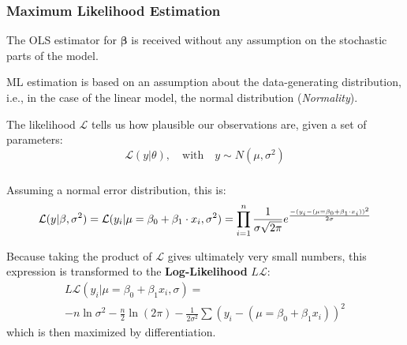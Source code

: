\documentclass{beamer}
\newenvironment{VerbatimIN}
 {\VerbatimEnvironment
  \begin{tcolorbox}[
    breakable,
    colback=lightgray,
    spartan
  ]%
  \begin{Verbatim}}
 {\end{Verbatim}\end{tcolorbox}}
\newenvironment{VerbatimOUT}
 {\VerbatimEnvironment
  \begin{tcolorbox}[
    breakable,
    spartan
  ]%
  \begin{Verbatim}}
 {\end{Verbatim}\end{tcolorbox}}
\begin{document}

\begin{frame}
    \frametitle{Maximum Likelihood Estimation}
    The OLS estimator for $\mathbf{{\beta}}$ is received without any assumption on the stochastic parts of the model.
    
    ML estimation is based on an assumption about the data-generating distribution, i.e., in the case of the linear model, the normal distribution (\textit{Normality}).
    
    The likelihood $\mathcal{L}$ tells us how plausible our observations are, given a set of parameters:
    \begin{equation*}
        \mathcal{L}(y | \theta), \quad \text{with} \quad y \sim N(\mu, \sigma^2)
    \end{equation*}
\end{frame}

\begin{frame}
    \frametitle{}
    Assuming a normal error distribution, this is:
    \begin{equation*}
        \scriptsize{\mathcal{L}( y | \beta, \sigma^2) = \mathcal{L}(y_i|\mu = \beta_0 + \beta_1 \cdot x_i, \sigma^2) = \prod_{i=1}^n \frac{1}{\sigma \sqrt{2 \pi}} e^\frac{-(y_i - (\mu = \beta_0 + \beta_1 \cdot x_i))^2}{2 \sigma}}
    \end{equation*}
    \vspace{0.5cm}
    
    Because taking the product of $\mathcal{L}$ gives ultimately very small numbers, this expression is transformed to the \textbf{Log-Likelihood} $L\mathcal{L}$:
    \begin{multline*}
        L\mathcal{L}(y_i | \mu = \beta_0 + \beta_1 x_i, \sigma) = \\
        -n \ln \sigma^2 - \frac n2 \ln (2 \pi) - \frac{1}{2 \sigma^2} \sum (y_i - (\mu = \beta_0 + \beta_1 x_i))^2    
    \end{multline*}
    which is then maximized by differentiation.
\end{frame}
\end{document}
